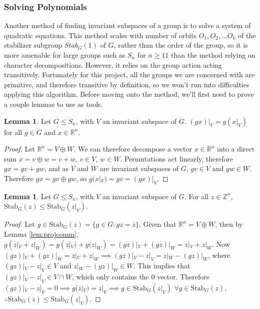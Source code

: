\documentclass[11pt]{article} %
\theoremstyle{definition}
\newtheorem{lemma}[theorem]{Lemma}
\theoremstyle{remark}
\newcommand{\ZZ}{\mathbb{Z}}
\newcommand{\RR}{\mathbb{R}}
\newcommand{\stab}[2]{\textrm{Stab}_{#1}({#2})}
\begin{document}
\subsubsection{Solving Polynomials}

Another method of finding invariant subspaces of a group is to solve a system of quadratic equations. This method scales with number of orbits $O_1, O_2, ... O_k$ of the stabilizer subgroup $Stab_G(1)$ of $G$, rather than the order of the group, so it is more amenable for large groups such as $S_n$ for $n \geq 11$ than the method relying on character decompositions. However, it relies on the group action acting transitively. Fortunately for this project, all the groups we are concerned with are primitive, and therefore transitive by definition, so we won't run into difficulties applying this algorithm. Before moving onto the method, we'll first need to prove a couple lemmas to use as tools.

\begin{lemma}\label{lem:projcomm}
Let $G \leq S_n$, with $V$ an invariant subspace of $G$. $(gx)|_V = g(x|_V)$ for all $g \in G$ and $x \in \RR^n$.
\end{lemma}

\begin{proof}
Let $\RR^n = V \oplus W$. We can therefore decompose a vector $x \in \RR^n$ into a direct sum $x = v \oplus w = v + w$, $v \in V$, $w \in W$. Permutations act linearly, therefore $gx = gv + gw$, and as $V$ and $W$ are invariant subspaces of $G$, $gv \in V$ and $gw \in W$. Therefore $gx = gv \oplus gw$, so $g(x|_V) = gv = (gx)|_V$.
\end{proof}

\begin{lemma}\label{lem:stabsub}
Let $G \leq S_n$, with $V$ an invariant subspace of $G$. For all $z \in \ZZ^n$, $\stab{G}{z} \leq \stab{G}{z|_V}$.
\end{lemma}

\begin{proof}
Let $g \in \stab{G}{z} = \lbrace g \in G : gz = z \rbrace$. Given that $\RR^n = V \oplus W$, then by Lemma \eqref{lem:projcomm}, $g(z|_V + z|_W) = g(z|_V) + g(z|_W) = (gz)|_V + (gz)|_W = z|_V + z|_W$. Now $(gz)|_V + (gz)|_W = z|_V + z|_W \implies (gz)|_V - z|_V = z|_W - (gz)|_W$, where $(gz)|_V - z|_V \in V$ and $ z|_W - (gz)|_W \in W$. This implies that $(gz)|_V - z|_V \in V \cap W$, which only contains the 0 vector. Therefore $(gz)|_V - z|_V = 0 \implies g(z|_V) = z|_V \implies g \in \stab{G}{z|_V}$ $\forall g \in \stab{G}{z}$, $\therefore \stab{G}{z} \leq \stab{G}{z|_V}$.
\end{proof}
\end{document}

